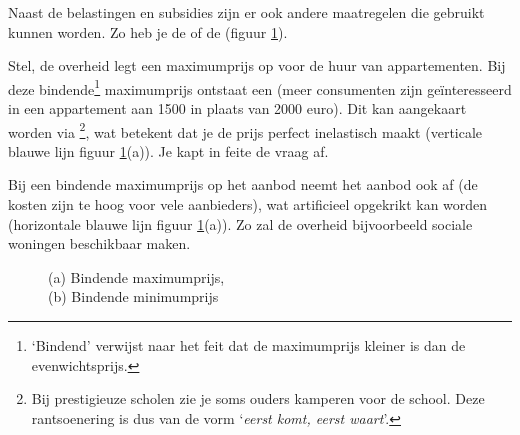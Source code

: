 Naast de belastingen en subsidies zijn er ook andere maatregelen die gebruikt kunnen worden. Zo heb je de  of de  (figuur \ref{fig:h2-quota}).\\

\par Stel, de overheid legt een maximumprijs op voor de huur van appartementen. Bij deze bindende\footnote{`Bindend' verwijst naar het feit dat de maximumprijs kleiner is dan de evenwichtsprijs.} maximumprijs ontstaat een  (meer consumenten zijn ge\"interesseerd in een appartement aan 1500 in plaats van 2000 euro). Dit kan aangekaart worden via \footnote{Bij prestigieuze scholen zie je soms ouders kamperen voor de school. Deze rantsoenering is dus van de vorm `\textit{eerst komt, eerst waart}'.}, wat betekent dat je de prijs perfect inelastisch maakt (verticale blauwe lijn figuur \ref{fig:h2-quota}(a)). Je kapt in feite de vraag af.
\par Bij een bindende maximumprijs op het aanbod neemt het aanbod ook af (de kosten zijn te hoog voor vele aanbieders), wat artificieel opgekrikt kan worden (horizontale blauwe lijn figuur \ref{fig:h2-quota}(a)). Zo zal de overheid bijvoorbeeld sociale woningen beschikbaar maken.

\begin{figure}[H]
\centering
\captionsetup{justification=centering,margin=2cm}
\caption{(a) Bindende maximumprijs, \\(b) Bindende minimumprijs}
\label{fig:h2-quota}
\end{figure}

